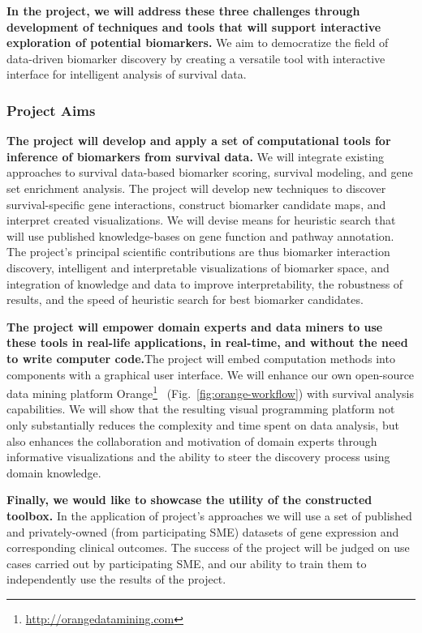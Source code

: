 \documentclass[11pt,a4paper]{article}
\newcommand{\myurl}[1]{\footnote{\url{#1}}}
\renewcommand{\bold}{\textbf}
\begin{document}
\bold{In the project, we will address these three challenges through development of techniques and tools that will support interactive exploration of potential biomarkers.} We aim to democratize the field of data-driven biomarker discovery by creating a versatile tool with interactive interface for intelligent analysis of survival data.

\subsubsection*{Project Aims}

\bold{The project will develop and apply a set of computational tools for inference of biomarkers from survival data.} We will integrate existing approaches to survival data-based biomarker scoring, survival modeling, and gene set enrichment analysis. The project will develop new techniques to discover survival-specific gene interactions, construct biomarker candidate maps, and interpret created visualizations. We will devise means for heuristic search that will use published knowledge-bases on gene function and pathway annotation. The project's principal scientific contributions are thus biomarker interaction discovery, intelligent and interpretable visualizations of biomarker space, and integration of knowledge and data to improve interpretability, the robustness of results, and the speed of heuristic search for best biomarker candidates.

\bold{The project will empower domain experts and data miners to use these tools in real-life applications, in real-time, and without the need to write computer code.}The project will embed computation methods into components with a graphical user interface. We will enhance our own open-source data mining platform Orange\myurl{http://orangedatamining.com}~\cite{Demsar2013,Curk2005,Godec2019} (Fig.~\ref{fig:orange-workflow}) with survival analysis capabilities. We will show that the resulting visual programming platform not only substantially reduces the complexity and time spent on data analysis, but also enhances the collaboration and motivation of domain experts through informative visualizations and the ability to steer the discovery process using domain knowledge.

\bold{Finally, we would like to showcase the utility of the constructed toolbox.} In the application of project's approaches we will use a set of published and privately-owned (from participating SME) datasets of gene expression and corresponding clinical outcomes. The success of the project will be judged on use cases carried out by participating SME, and our ability to train them to independently use the results of the project.
\end{document}
